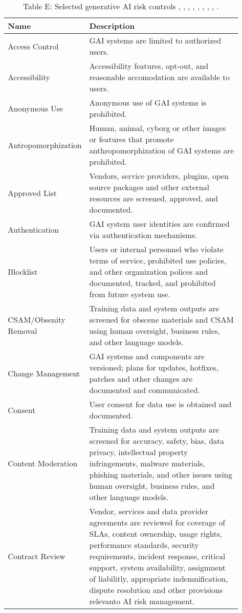 \documentclass[fleqn]{article}
\begin{document}
\begin{table}[H]
	\caption*{Table E: Selected generative AI risk controls \cite{airmf}, \cite{playbook}, \cite{ai600-1}, \cite{iso42001}, \cite{mcgraw2024architectural}, \cite{mcgraw2020architectural}, \cite{msft_rai_std}, \cite{uk_ai_safety}, \cite{occ_mrm}. }
	\label{tab:controls}
	\scriptsize
	\begin{tabular}{|m{0.25\linewidth} |m{0.70\linewidth} |}
		\hline
		\textbf{Name} & \textbf{Description} \\
		\hline
		Access Control  & GAI systems are limited to authorized users.  \\ \hline
		Accessibility  & Accessibility features, opt-out, and reasonable accomodation are available to users. \\ \hline
		Anonymous Use & Anonymous use of GAI systems is prohibited.  \\ \hline
		Antropomorphization  & Human, animal, cyborg or other images or features that promote anthropomorphization of GAI systems are prohibited.   \\ \hline
		Approved List & Vendors, service providers, plugins, open source packages and other external resources are screened, approved, and documented.  \\ \hline
		Authentication  & GAI system user identities are confirmed via authentication mechanisms.  \\ \hline
		Blocklist  & Users or internal personnel who violate terms of service, prohibited use policies, and other organization polices and documented, tracked, and prohibited from future system use.  \\ \hline
		CSAM/Obsenity Removal  & Training data and system outputs are screened for obscene materials and CSAM using human oversight, business rules, and other language models.   \\ \hline
		Change Management & GAI systems and components are versioned; plans for updates, hotfixes, patches and other changes are documented and communicated.   \\ \hline
		Consent & User consent for data use is obtained and documented.  \\ \hline
		Content Moderation & Training data and system outputs are screened for accuracy, safety, bias, data privacy, intellectual property infringements, malware materials, phishing materials, and other issues using human oversight, business rules, and other language models.   \\ \hline
		Contract Review & Vendor, services and data provider agreements are reviewed for coverage of SLAs, content ownership, usage rights, performance standards, security requirements, incident response, critical support, system availability, assignment of liabilitly, appropriate indemnification, dispute resolution and other provisions relevanto AI risk management.  \\ \hline

\end{tabular}
\end{table}
\end{document}
